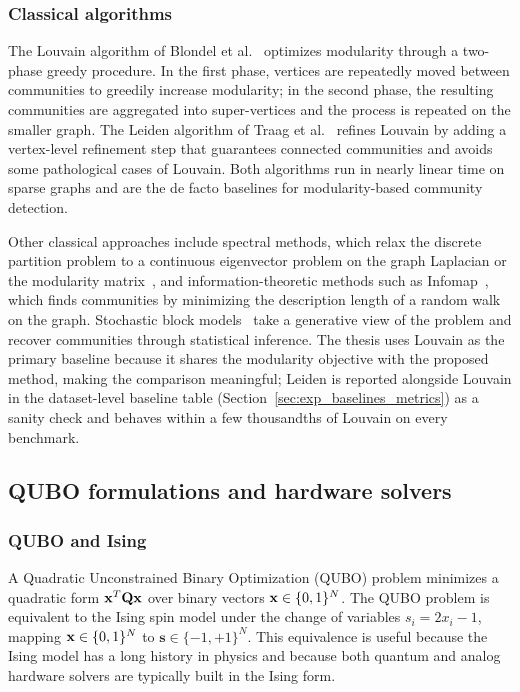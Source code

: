 \subsubsection{Classical algorithms}
\label{sec:rw_classical}

The Louvain algorithm of Blondel et al.~\cite{blondel2008louvain}
optimizes modularity through a two-phase greedy procedure. In the
first phase, vertices are repeatedly moved between communities to
greedily increase modularity; in the second phase, the resulting
communities are aggregated into super-vertices and the process is
repeated on the smaller graph. The Leiden algorithm of Traag et
al.~\cite{traag2019leiden} refines Louvain by adding a vertex-level
refinement step that guarantees connected communities and avoids
some pathological cases of Louvain. Both algorithms run in nearly
linear time on sparse graphs and are the de facto baselines for
modularity-based community detection.

Other classical approaches include spectral methods, which relax the
discrete partition problem to a continuous eigenvector problem on
the graph Laplacian or the modularity
matrix~\cite{newman2013spectral, shi2000normalized}, and
information-theoretic methods such as
Infomap~\cite{rosvall2008infomap}, which finds communities by
minimizing the description length of a random walk on the graph.
Stochastic block models~\cite{karrer2011stochastic} take a generative
view of the problem and recover communities through statistical
inference. The thesis uses Louvain as the primary baseline
because it shares the modularity objective with the proposed
method, making the comparison meaningful; Leiden is reported
alongside Louvain in the dataset-level baseline table
(Section~\ref{sec:exp_baselines_metrics}) as a sanity check and
behaves within a few thousandths of Louvain on every benchmark.

\subsection{QUBO formulations and hardware solvers}
\label{sec:rw_qubo}

\subsubsection{QUBO and Ising}
\label{sec:rw_lucas}

A Quadratic Unconstrained Binary Optimization (QUBO) problem
minimizes a quadratic form $\mathbf{x}^T \mathbf{Q} \mathbf{x}$ over binary vectors $\mathbf{x}
\in \{0,1\}^N$. The QUBO problem is equivalent to the Ising spin
model under the change of variables $s_i = 2 x_i - 1$, mapping $\mathbf{x}
\in \{0,1\}^N$ to $\mathbf{s} \in \{-1, +1\}^N$. This equivalence is
useful because the Ising model has a long history in physics and
because both quantum and analog hardware solvers are typically built
in the Ising form.


